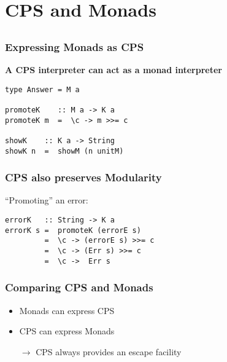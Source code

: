 \documentclass{beamer}
\begin{document}
\section{CPS and Monads}
\subsection{}
\begin{frame}[fragile]
\frametitle{Expressing Monads as CPS}
\textbf{A CPS interpreter can act as a monad interpreter}
\begin{lstlisting}
type Answer = M a

promoteK    :: M a -> K a
promoteK m  =  \c -> m >>= c

showK    :: K a -> String
showK n  =  showM (n unitM)
\end{lstlisting}


\end{frame}


\begin{frame}[fragile]
\frametitle{CPS also preserves Modularity}
``Promoting'' an error:
\begin{lstlisting}
errorK   :: String -> K a
errorK s =  promoteK (errorE s)
         =  \c -> (errorE s) >>= c
         =  \c -> (Err s) >>= c
         =  \c ->  Err s
\end{lstlisting}

\end{frame}


\begin{frame}[fragile]
\frametitle{Comparing CPS and Monads}
\begin{itemize}
\item Monads can express CPS
\item CPS can express Monads
\item[$\rightarrow$] CPS always provides an escape facility
\end{itemize}
\end{frame}
\end{document}
